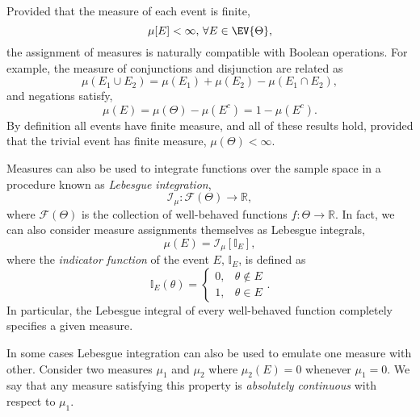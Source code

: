 Provided that the measure of each event is finite, 
%
\begin{equation*}
\mu \! \left[ E \right] < \infty, \, \forall E \in \EV{\Theta},
\end{equation*}
%
the assignment of measures is naturally compatible with Boolean
operations.  For example, the measure of conjunctions and
disjunction are related as
%
\begin{equation*}
\mu \! \left( E_{1} \cup E_{2} \right)
= 
\mu \! \left( E_{1} \right) + \mu \! \left( E_{2} \right)
- \mu \! \left( E_{1} \cap E_{2} \right),
\end{equation*}
%
and negations satisfy,
%
\begin{equation*}
\mu \! \left( E \right)
= 
\mu \! \left( \Theta \right) - \mu \! \left( E^{c} \right)
=
1 - \mu \! \left( E^{c} \right).
\end{equation*}
%
By definition all events have finite measure, and all of these results
hold, provided that the trivial event has finite measure, 
$\mu \! \left( \Theta \right) < \infty$.

Measures can also be used to integrate functions over the sample
space in a procedure known as \emph{Lebesgue integration},
%
\begin{equation*}
\mathcal{I}_{\mu} : 
\mathcal{F} \! \left( \Theta \right) \rightarrow \mathbb{R},
\end{equation*}
%
where $\mathcal{F} \! \left( \Theta \right)$ is the collection of 
well-behaved functions $f : \Theta \rightarrow \mathbb{R}$.  In 
fact, we can also consider measure assignments themselves 
as Lebesgue integrals,
%
\begin{equation*}
\mu \! \left( E \right)
= 
\mathcal{I}_{\mu} \! \left[ \mathbb{I}_{E} \right],
\end{equation*}
%
where the \emph{indicator function} of the event $E$, $\mathbb{I}_{E}$,
is defined as
%
\begin{equation*}
\mathbb{I}_{E} \! \left( \theta \right)
= 
\left\{
\begin{array}{rr}
0, & \theta \notin E \\
1, & \theta \in E
\end{array}
\right. .
\end{equation*}
%
In particular, the Lebesgue integral of every well-behaved function
completely specifies a given measure.

In some cases Lebesgue integration can also be used to emulate 
one measure with other.  Consider two measures $\mu_{1}$
and $\mu_{2}$ where $\mu_{2} \! \left( E \right) = 0$ whenever 
$\mu_{1} = 0$.  We say that any measure satisfying this property 
is \emph{absolutely continuous} with respect to $\mu_{1}$.  

